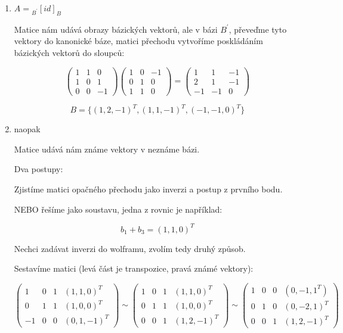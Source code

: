 \documentclass[10pt,a4paper]{article}
\begin{document}
\begin{enumerate}
\item $A = {}_{B^\prime}[id]_B$

Matice nám udává obrazy bázických vektorů, ale v bázi $B^\prime$, převeďme tyto vektory do kanonické báze, matici přechodu vytvoříme poskládáním bázických vektorů do sloupců:

\begin{equation*}
\begin{pmatrix}
1 & 1 & 0\\ 
1 & 0 & 1\\
0 & 0 & -1
\end{pmatrix}\begin{pmatrix}
1 & 0 &-1 \\ 
0 & 1 & 0 \\
1 & 1 & 0
\end{pmatrix} = 
\begin{pmatrix}
1 & 1 &-1 \\ 
2 & 1 &-1 \\
-1&-1 & 0
\end{pmatrix}
\end{equation*}


\begin{equation*}
B = \{(1, 2, -1)^T, (1,1,-1)^T, (-1,-1,0)^T \}
\end{equation*}

\item naopak

Matice udává nám známe vektory v neznáme bázi.

Dva postupy:

Zjistíme matici opačného přechodu jako inverzi a postup z prvního bodu.

NEBO řešíme jako soustavu, jedna z rovnic je například:

\begin{equation*}
b_1 + b_3 =(1,1,0)^T
\end{equation*} 

Nechci zadávat inverzi do wolframu, zvolím tedy druhý způsob.

Sestavíme matici (levá část je transpozice, pravá známé vektory):

\begin{equation*}
\left( \begin{array}{ccc|c}
1 & 0 & 1 & (1,1,0)^T \\ 
0 & 1 & 1 & (1,0,0)^T \\
-1& 0 & 0 & (0, 1,-1)^T
\end{array} \right) \sim 
\left( \begin{array}{ccc|c}
1 & 0 & 1 & (1,1,0)^T \\ 
0 & 1 & 1 & (1,0,0)^T \\
0 & 0 & 1 & (1, 2,-1)^T
\end{array} \right) \sim 
\left( \begin{array}{ccc|c}
1 & 0 & 0 & (0,-1,1^T) \\ 
0 & 1 & 0 & (0,-2,1)^T \\
0 & 0 & 1 & (1, 2,-1)^T
\end{array} \right)
\end{equation*}


\end{enumerate}
\end{document}
